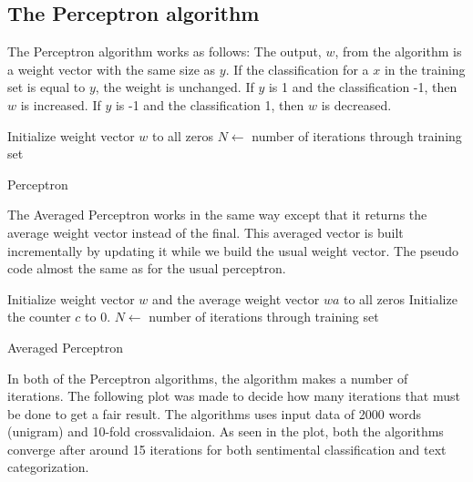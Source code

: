 \subsection{The Perceptron algorithm}
The Perceptron algorithm works as follows:
The output, $w$, from the algorithm is a weight vector with the same size as $y$. If the classification for a $x$ in the training set is equal to $y$, the weight is unchanged.
If $y$ is 1 and the classification -1, then $w$ is increased. If $y$ is -1 and the classification 1, then $w$ is decreased. \citep{perceptron_ai}
\begin{algorithm}[h!]
\label{algorithm:perceptron}
 \SetAlgoLined
 Initialize weight vector $w$ to all zeros\;
 $N \leftarrow$ number of iterations through training set\;
 \caption{Perceptron}
\end{algorithm}
The Averaged Perceptron works in the same way except that it returns the average weight vector instead of the final.
This averaged vector is built incrementally by updating it while we build the usual weight vector. The pseudo code almost the same as for the usual perceptron.
\begin{algorithm}[h!]
\label{algorithm:perceptron}
 \SetAlgoLined
 Initialize weight vector $w$ and the average weight vector $wa$ to all zeros\;
 Initialize the counter $c$ to 0.\;
 $N \leftarrow$ number of iterations through training set\;
 \caption{Averaged Perceptron}
\end{algorithm}
In both of the Perceptron algorithms, the algorithm makes a number of iterations. The following plot was made to decide how many iterations that must be done to get a fair result. The algorithms uses input data of 2000 words (unigram) and 10-fold crossvalidaion. As seen in the plot, both the algorithms converge after around 15 iterations for both sentimental classification and text categorization.
